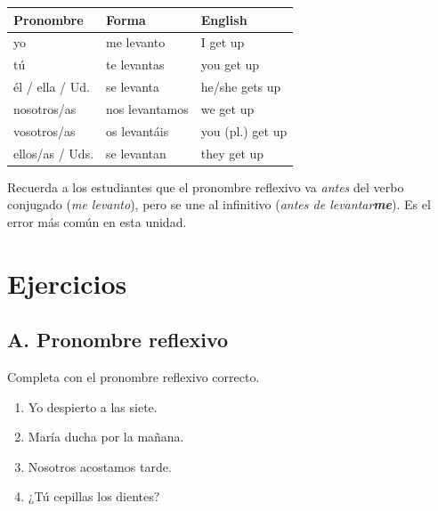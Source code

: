 \documentclass[11pt]{article}
\begin{document}
\begin{center}\renewcommand{\arraystretch}{1.3}
\begin{tabular}{@{} l l l @{}}
    \toprule
    \textbf{Pronombre} & \textbf{Forma} & \textbf{English} \\
    \midrule
    yo                & me levanto      & I get up \\
    tú                & te levantas     & you get up \\
    él / ella / Ud.   & se levanta      & he/she gets up \\
    nosotros/as       & nos levantamos  & we get up \\
    vosotros/as       & os levantáis    & you (pl.) get up \\
    ellos/as / Uds.   & se levantan     & they get up \\
    \bottomrule
\end{tabular}\end{center}

\begin{note}
    Recuerda a los estudiantes que el pronombre reflexivo va \emph{antes} del
    verbo conjugado (\textit{me levanto}), pero se une al infinitivo
    (\textit{antes de levantar\textbf{me}}). Es el error más común en esta unidad.
\end{note}

\section{Ejercicios}

\subsection{A. Pronombre reflexivo}
Completa con el pronombre reflexivo correcto.
\begin{enumerate}[leftmargin=*, label=\numbox{\arabic*}]
    \item Yo  despierto a las siete.
    \item María  ducha por la mañana.
    \item Nosotros  acostamos tarde.
    \item ¿Tú  cepillas los dientes?
\end{enumerate}
\end{document}

